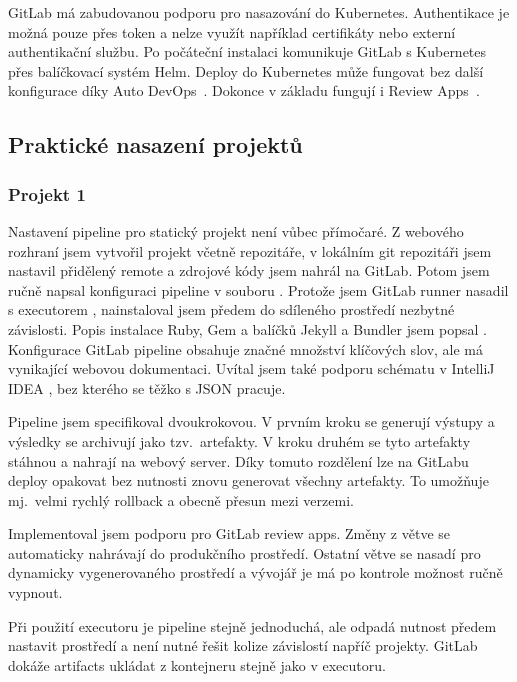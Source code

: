         GitLab má zabudovanou podporu pro nasazování do Kubernetes. Authentikace je možná pouze přes token a nelze využít například certifikáty nebo externí authentikační službu. Po počáteční instalaci komunikuje GitLab s Kubernetes přes balíčkovací systém Helm. Deploy do Kubernetes může fungovat bez další konfigurace díky Auto DevOps~\cite{gitlab-auto-devops}. Dokonce v základu fungují i Review Apps~\cite{gitlab-review-apps}.

    \subsection{Praktické nasazení projektů}
        \subsubsection{Projekt 1}
            \label{subsec:gitlab-p1}
            Nastavení pipeline pro statický projekt není vůbec přímočaré. Z webového rozhraní jsem vytvořil projekt včetně repozitáře, v lokálním git repozitáři jsem nastavil přidělený remote a zdrojové kódy jsem nahrál na GitLab. Potom jsem ručně napsal konfiguraci pipeline v souboru . Protože jsem GitLab runner nasadil s executorem , nainstaloval jsem předem do sdíleného prostředí nezbytné závislosti. Popis instalace Ruby, Gem a balíčků Jekyll a Bundler jsem popsal . Konfigurace GitLab pipeline obsahuje značné množství klíčových slov, ale má vynikající webovou dokumentaci. Uvítal jsem také podporu schématu v  IntelliJ IDEA \cite{idea-gitlab-plugin}, bez kterého se těžko s JSON pracuje.

            Pipeline jsem specifikoval dvoukrokovou. V prvním kroku se generují výstupy a výsledky se archivují jako tzv.~artefakty. V kroku druhém  se tyto artefakty stáhnou a nahrají na webový server. Díky tomuto rozdělení lze na GitLabu deploy opakovat bez nutnosti znovu generovat všechny artefakty. To umožňuje mj.~velmi rychlý rollback a obecně přesun mezi verzemi.

            Implementoval jsem podporu pro GitLab review apps. Změny z větve  se automaticky nahrávají do produkčního prostředí. Ostatní větve se nasadí pro dynamicky vygenerovaného prostředí a vývojář je má po kontrole možnost ručně vypnout.

            Při použití  executoru je pipeline stejně jednoduchá, ale odpadá nutnost předem nastavit prostředí a není nutné řešit kolize závislostí napříč projekty. GitLab dokáže artifacts ukládat z kontejneru stejně jako v  executoru.

